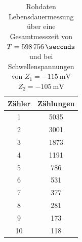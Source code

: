 \documentclass{article}
\begin{document}
\begin{table}[H]
    \centering
    \caption{Rohdaten Lebensdauermessung über eine Gesamtmesszeit von $T=\SI{598756}{\seconds}$ und bei
             Schwellenspannungen von $Z_1=\SI{-115}{\milli\volt}$ $Z_2=\SI{-105}{\milli\volt}$}
    \begin{tabular}{|c|c|}
        \hline
        Zähler & Zählungen \\ \hline \hline
        1 & 5035\\ \hline
        2 & 3001\\ \hline
        3 & 1873\\ \hline
        4 & 1191\\ \hline
        5 & 786\\ \hline
        6 & 531\\ \hline
        7 & 377\\ \hline
        8 & 281\\ \hline
        9 & 173\\ \hline
        10 & 118\\ \hline
    \end{tabular}
    \label{tab:ZahlrateLebensdauer}
\end{table}


\newpage
\printbibliography[heading=bibintoc]
\end{document}
